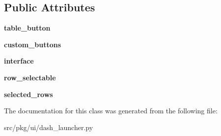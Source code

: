 \subsection*{Public Attributes}
\begin{DoxyCompactItemize}
\item 
\mbox{\label{classrnb-planning_1_1src_1_1pkg_1_1ui_1_1dash__launcher_1_1_table_info_a8c8c11cb802d95491d8baa2d7f4e2dca}} 
{\bfseries table\+\_\+button}
\item 
\mbox{\label{classrnb-planning_1_1src_1_1pkg_1_1ui_1_1dash__launcher_1_1_table_info_a407b9d6f2a298a447c3a445e23050c5c}} 
{\bfseries custom\+\_\+buttons}
\item 
\mbox{\label{classrnb-planning_1_1src_1_1pkg_1_1ui_1_1dash__launcher_1_1_table_info_ade79a581140730c37a2bf648f6f24a14}} 
{\bfseries interface}
\item 
\mbox{\label{classrnb-planning_1_1src_1_1pkg_1_1ui_1_1dash__launcher_1_1_table_info_ac4e8788f6a880c10ea5259f5668b8766}} 
{\bfseries row\+\_\+selectable}
\item 
\mbox{\label{classrnb-planning_1_1src_1_1pkg_1_1ui_1_1dash__launcher_1_1_table_info_ad3dda2199b371f397331fd01f00acfd2}} 
{\bfseries selected\+\_\+rows}
\end{DoxyCompactItemize}


The documentation for this class was generated from the following file\+:\begin{DoxyCompactItemize}
\item 
src/pkg/ui/dash\+\_\+launcher.\+py\end{DoxyCompactItemize}
